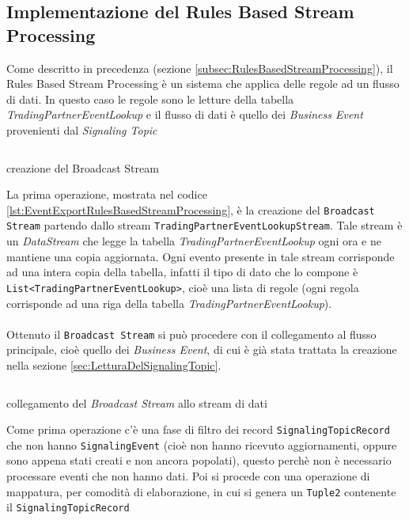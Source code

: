 \subsection{Implementazione del Rules Based Stream Processing}
\label{subsec:ImplementazioneDelRulesBasedStreamProcessing}
Come descritto in precedenza (sezione \ref{subsec:RulesBasedStreamProcessing}), il Rules Based Stream Processing è un sistema che applica delle regole ad un flusso di dati.
In questo caso le regole sono le letture della tabella \textit{TradingPartnerEventLookup} e il flusso di dati è quello dei \textit{Business Event} provenienti dal \textit{Signaling Topic}
\begin{code}
    \inputminted[linenos,fontsize=\footnotesize]{java}{listings/EventsExport/TradingPartnerBroadcast.java}
    \caption{creazione del Broadcast Stream}
    \label{lst:EventExportRulesBasedStreamProcessing}
\end{code}
La prima operazione, mostrata nel codice \ref{lst:EventExportRulesBasedStreamProcessing}, è la creazione del \texttt{Broadcast Stream} partendo dallo stream \texttt{TradingPartnerEventLookupStream}.
Tale stream è un \textit{DataStream} che legge la tabella \textit{TradingPartnerEventLookup} ogni ora e ne mantiene una copia aggiornata. 
Ogni evento presente in tale stream corrisponde ad una intera copia della tabella, infatti il tipo di dato che lo compone è \texttt{List<TradingPartnerEventLookup>}, 
cioè una lista di regole (ogni regola corrisponde ad una riga della tabella \textit{TradingPartnerEventLookup}).\\\\
Ottenuto il \texttt{Broadcast Stream} si può procedere con il collegamento al flusso principale, cioè quello dei \textit{Business Event},
di cui è già stata trattata la creazione nella sezione \ref{sec:LetturaDelSignalingTopic}. 
\begin{code}
    \inputminted[linenos,fontsize=\footnotesize]{java}{listings/EventsExport/StreamConnection.java}
    \caption{collegamento del \textit{Broadcast Stream} allo stream di dati}
    \label{lst:StreamsConnection}
\end{code}
Come prima operazione c'è una fase di filtro dei record \texttt{SignalingTopicRecord} che non hanno \texttt{SignalingEvent} (cioè non hanno ricevuto aggiornamenti, 
oppure sono appena stati creati e non ancora popolati), questo perchè non è necessario processare eventi che non hanno dati.
Poi si procede con una operazione di mappatura, per comodità di elaborazione, in cui si genera un \texttt{Tuple2} contenente il \texttt{SignalingTopicRecord}

